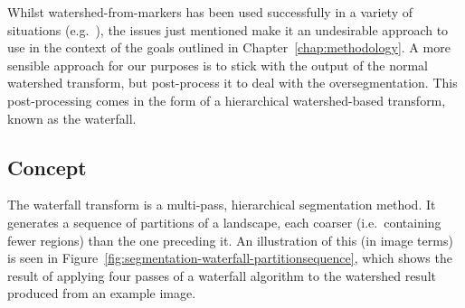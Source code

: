 Whilst watershed-from-markers has been used successfully in a variety of situations (e.g.~\cite{chae07,gonzalez07}), the issues just mentioned make it an undesirable approach to use in the context of the goals outlined in Chapter~\ref{chap:methodology}. A more sensible approach for our purposes is to stick with the output of the normal watershed transform, but post-process it to deal with the oversegmentation. This post-processing comes in the form of a hierarchical watershed-based transform, known as the waterfall.

\subsection{Concept}

The waterfall transform is a multi-pass, hierarchical segmentation method. It generates a sequence of partitions of a landscape, each coarser (i.e.~containing fewer regions) than the one preceding it. An illustration of this (in image terms) is seen in Figure~\ref{fig:segmentation-waterfall-partitionsequence}, which shows the result of applying four passes of a waterfall algorithm to the watershed result produced from an example image.

